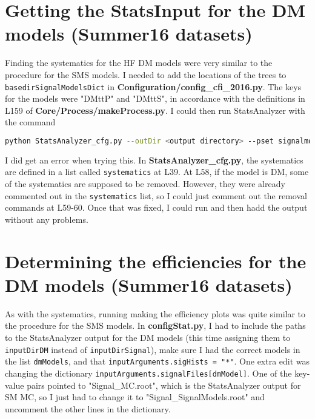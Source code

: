 \section{Getting the StatsInput for the DM models (Summer16 datasets)}

Finding the systematics for the HF DM models were very similar to the procedure for the SMS models. I needed to add the locations of the trees to \texttt{basedirSignalModelsDict} in \textbf{Configuration/config\_cfi\_2016.py}. The keys for the models were "DMttP" and "DMttS", in accordance with the definitions in L159 of \textbf{Core/Process/makeProcess.py}. I could then run StatsAnalyzer with the command 

\begin{lstlisting}[belowskip=-0.7cm, language=sh, numbers=none]
python StatsAnalyzer_cfg.py --outDir <output directory> --pset signalmodel --signalModel <key from config_cfi_2016, no other prefix/suffix> --nCores <number of cores> --dataMC mc
\end{lstlisting}

I did get an error when trying this. In \textbf{StatsAnalyzer\_cfg.py}, the systematics are defined in a list called \texttt{systematics} at L39. At L58, if the model is DM, some of the systematics are supposed to be removed. However, they were already commented out in the \texttt{systematics} list, so I could just comment out the removal commands at L59-60. Once that was fixed, I could run and then hadd the output without any problems.


\section{Determining the efficiencies for the DM models (Summer16 datasets)}

As with the systematics, running making the efficiency plots was quite similar to the procedure for the SMS models. In \textbf{configStat.py}, I had to include the paths to the StatsAnalyzer output for the DM models (this time assigning them to \texttt{inputDirDM} instead of \texttt{inputDirSignal}), make sure I had the correct models in the list \texttt{dmModels}, and that \texttt{inputArguments.sigHists = "*"}. One extra edit was changing the dictionary \texttt{inputArguments.signalFiles[dmModel]}. One of the key-value pairs pointed to "Signal\_MC.root", which is the StatsAnalyzer output for SM MC, so I just had to change it to "Signal\_SignalModels.root" and uncomment the other lines in the dictionary.

